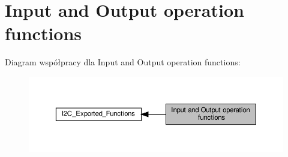 \hypertarget{group___i2_c___exported___functions___group2}{}\section{Input and Output operation functions}
\label{group___i2_c___exported___functions___group2}
Diagram współpracy dla Input and Output operation functions\+:\nopagebreak
\begin{figure}[H]
\begin{center}
\leavevmode
\includegraphics[width=350pt]{group___i2_c___exported___functions___group2}
\end{center}
\end{figure}

